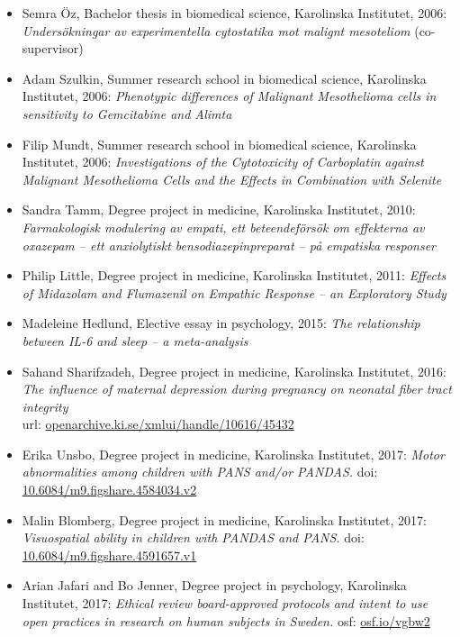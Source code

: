\documentclass[10pt]{article}
\begin{document}
\begin{itemize}[nolistsep]
	\begin{itemize}[nolistsep]
      \item Semra Öz, Bachelor thesis in biomedical science, Karolinska Institutet, 2006: \textit{Undersökningar av experimentella cytostatika mot malignt mesoteliom} (co-supervisor)
      \item Adam Szulkin, Summer research school in biomedical science, Karolinska Institutet, 2006: \textit{Phenotypic differences of Malignant Mesothelioma cells in sensitivity to Gemcitabine and Alimta}
      \item Filip Mundt, Summer research school in biomedical science, Karolinska Institutet, 2006: \textit{Investigations of the Cytotoxicity of Carboplatin against Malignant Mesothelioma Cells and the Effects in Combination with Selenite}
	\item Sandra Tamm, Degree project in medicine, Karolinska Institutet, 2010: \emph{Farmakologisk modulering av empati, ett beteendeförsök om effekterna av oxazepam – ett anxiolytiskt bensodiazepinpreparat – på empatiska responser}
	\item Philip Little, Degree project in medicine, Karolinska Institutet, 2011: \emph{Effects of Midazolam and Flumazenil on Empathic Response – an Exploratory Study}
	\item Madeleine Hedlund, Elective essay in psychology, 2015: \emph{The relationship between IL-6 and sleep
– a meta-analysis}
	\item Sahand Sharifzadeh, Degree project in medicine, Karolinska Institutet, 2016: \textit{The influence of maternal depression during pregnancy on neonatal fiber tract integrity}\\
	url: \href{https://openarchive.ki.se/xmlui/handle/10616/45432}{openarchive.ki.se/xmlui/handle/10616/45432}
	\item Erika Unsbo, Degree project in medicine, Karolinska Institutet, 2017: \emph{Motor abnormalities among children with PANS and/or PANDAS.}
	doi: \href{https://dx.doi.org/10.6084/m9.figshare.4584034.v2}{10.6084/m9.figshare.4584034.v2} 
	\item Malin Blomberg, Degree project in medicine, Karolinska Institutet, 2017: \emph{Visuospatial ability in children with PANDAS and PANS.} doi: \href{https://dx.doi.org/10.6084/m9.figshare.4591657.v1}{10.6084/m9.figshare.4591657.v1} 
	\item Arian Jafari and Bo Jenner, Degree project in psychology, Karolinska Institutet, 2017: \emph{Ethical review board-approved protocols and intent to use open practices in research on human subjects in Sweden.} osf: \href{https://osf.io/vgbw2/}{osf.io/vgbw2} 

\end{itemize}
\end{itemize}
\end{document}

